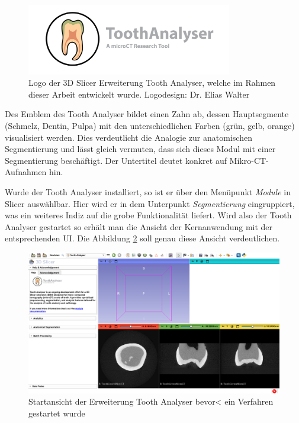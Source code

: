 \begin{figure}[h]
	\centering
	\includegraphics[width=0.8\textwidth]{img/SlicerToothAnalyser.png}
	\caption{Logo der 3D Slicer Erweiterung Tooth Analyser, welche im Rahmen dieser
	Arbeit entwickelt wurde. Logodesign: Dr. Elias Walter}
	\label{fig:logo_tooth_analyser}
\end{figure}

Des Emblem des Tooth Analyser bildet einen Zahn ab, dessen Hauptsegmente (Schmelz,
Dentin, Pulpa) mit den unterschiedlichen Farben (grün, gelb, orange)
visualisiert werden. Dies verdeutlicht die Analogie zur anatomischen Segmentierung
und lässt gleich vermuten, dass sich dieses Modul mit einer Segmentierung
beschäftigt. Der Untertitel deutet konkret auf Mikro-\ac{CT}-Aufnahmen hin.

Wurde der Tooth Analyser installiert, so ist er über den Menüpunkt \textit{Module}
in Slicer auswählbar. Hier wird er in dem Unterpunkt \textit{Segmentierung}
eingruppiert, was ein weiteres Indiz auf die grobe Funktionalität liefert. Wird
also der Tooth Analyser gestartet so erhält man die Ansicht der Kernanwendung
mit der entsprechenden \ac{UI}. Die Abbildung \ref{fig:tooth_analyser_start_up}
soll genau diese Ansicht verdeutlichen.

\begin{figure}[h]
	\centering
	\includegraphics[width=\textwidth]{img/toothAnalyserStartup.png}
	\caption{Startansicht der Erweiterung Tooth Analyser bevor< ein Verfahren gestartet
	wurde}
	\label{fig:tooth_analyser_start_up}
\end{figure}


